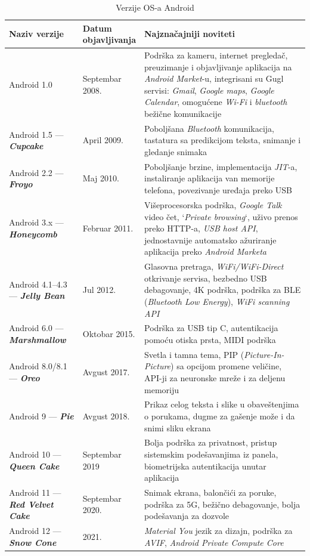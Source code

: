 \documentclass[android.tex]{subfiles}
\begin{document}
\begin{table}
\centering
\caption{Verzije OS-a Android}
\label{tbl:andrVerzije}
\begin{tabular}{p{0.25\linewidth} | p{0.15\linewidth}p{0.6\linewidth}}
\toprule
Naziv verzije & Datum objavljivanja & Najznačajniji noviteti \\
\toprule
Android 1.0 & Septembar 2008. & Podrška za kameru, internet pregledač, preuzimanje i objavljivanje aplikacija na \textit{Android Market}-u, integrisani su Gugl servisi: \textit{Gmail}, \textit{Google maps}, \textit{Google Calendar}, omogućene \textit{Wi-Fi} i \textit{bluetooth} bežične komunikacije\\\midrule
Android 1.5 --- \textbf{\textit{Cupcake}} & April 2009. & Poboljšana \textit{Bluetooth} komunikacija, tastatura sa predikcijom teksta, snimanje i gledanje snimaka\\\midrule
Android 2.2 --- \textbf{\textit{Froyo}} & Maj 2010. & Poboljšanje brzine, implementacija \textit{JIT}-a, instaliranje aplikacija van memorije telefona, povezivanje uređaja preko USB \\\midrule
Android 3.x --- \textbf{\textit{Honeycomb}} & Februar 2011. & Višeprocesorska podrška, \textit{Google Talk} video čet, `\textit{Private browsing}`, uživo prenos preko HTTP-a, \textit{USB host API}, jednostavnije automatsko ažuriranje aplikacija preko \textit{Android Marketa}\\\midrule
Android 4.1--4.3 --- \textbf{\textit{Jelly Bean}} & Jul 2012. & Glasovna pretraga, \textit{WiFi/WiFi-Direct} otkrivanje servisa, bezbedno USB debagovanje, 4K podrška, podrška za BLE (\textit{Bluetooth Low Energy}), \textit{WiFi scanning API}\\\midrule
Android 6.0 --- \textbf{\textit{Marshmallow}} & Oktobar 2015. & Podrška za USB tip C, autentikacija pomoću otiska prsta, MIDI podrška\\\midrule
Android 8.0/8.1 --- \textbf{\textit{Oreo}} & Avgust 2017. & Svetla i tamna tema, PIP (\textit{Picture-In-Picture}) sa opcijom promene veličine, API-ji za neuronske mreže i za deljenu memoriju\\\midrule
Android 9 --- \textbf{\textit{Pie}} & Avgust 2018. & Prikaz celog teksta i slike u obaveštenjima o porukama, dugme za gašenje može i da snimi sliku ekrana\\\midrule
Android 10 --- \textbf{\textit{Queen Cake}} & Septembar 2019 & Bolja podrška za privatnost, pristup sistemskim podešavanjima iz panela, biometrijska autentikacija unutar aplikacija\\\midrule
Android 11 --- \textbf{\textit{Red Velvet Cake}} & Septembar 2020. & Snimak ekrana, balončići za poruke, podrška za 5G, bežično debagovanje, bolja podešavanja za dozvole\\\midrule
Android 12 --- \textbf{\textit{Snow Cone}} & 2021. & \textit{Material You }jezik za dizajn, podrška za \textit{AVIF}, \textit{Android Private Compute Core}\\
\bottomrule
\end{tabular}
\end{table}
\end{document}
